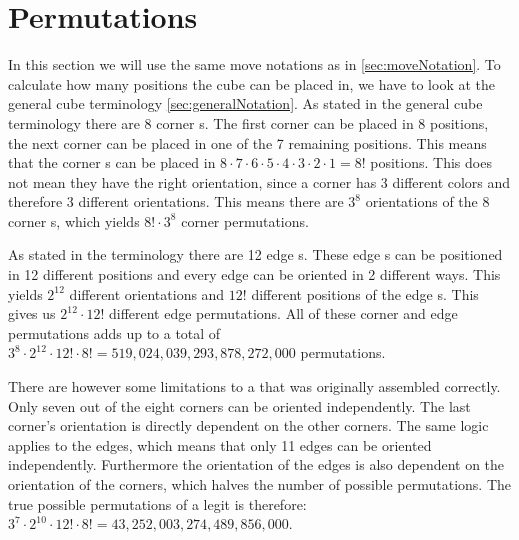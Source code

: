 \section{Permutations}
\label{sec:permutations}
In this section we will use the same move notations as in \ref{sec:moveNotation}.
To calculate how many positions the cube can be placed in, we have to look at the general cube terminology \ref{sec:generalNotation}.
As stated in the general cube terminology there are 8 corner \cpiece{}s. The first corner \cpiece{} can be placed in 8 positions, the next corner \cpiece{} can be placed in one of the 7 remaining positions. %
This means that the corner \cpiece{}s can be placed in $8\cdot7\cdot6\cdot5\cdot4\cdot3\cdot2\cdot1=8!$ positions. 
This does not mean they have the right orientation, since a corner \cpiece{} has 3 different colors and therefore 3 different orientations. This means there are $3^8$ orientations of the 8 corner \cpiece{}s, which yields $8!\cdot3^8$ corner permutations. 

As stated in the terminology there are 12 edge \cpiece{}s. These edge \cpiece{}s can be positioned in 12 different positions and every edge \cpiece{} can be oriented in 2 different ways. This yields $2^12$ different orientations and $12!$ different positions of the edge \cpiece{}s. This gives us $2^{12}\cdot12!$ different edge permutations. All of these corner and edge permutations adds up to a total of  $3^8\cdot2^{12}\cdot12!\cdot8!=519,024,039,293,878,272,000$ permutations.

There are however some limitations to a \rubik{} that was originally assembled correctly. 
Only seven out of the eight corners can be oriented independently. 
The last corner's orientation is directly dependent on the other corners. 
The same logic applies to the edges, which means that only 11 edges can be oriented independently.
Furthermore the orientation of the edges is also dependent on the orientation of the corners, which halves the number of possible permutations.
The true possible permutations of a legit \rubik{} is therefore:
$3^7\cdot2^{10}\cdot12!\cdot8!=43,252,003,274,489,856,000$.